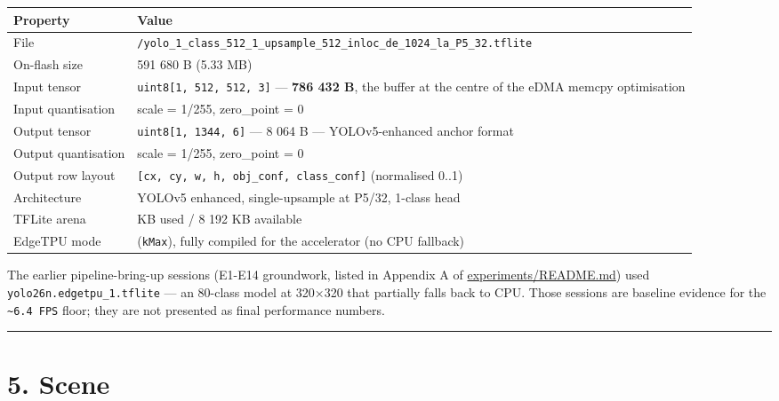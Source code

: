 {\def\LTcaptype{none} %
\begin{longtable}[]{@{}
  >{\raggedright\arraybackslash}p{}
  >{\raggedright\arraybackslash}p{}@{}}
\toprule\noalign{}
\begin{minipage}[b]{\linewidth}\raggedright
Property
\end{minipage} & \begin{minipage}[b]{\linewidth}\raggedright
Value
\end{minipage} \\
\midrule\noalign{}
\endhead
\bottomrule\noalign{}
\endlastfoot
File &
\texttt{/yolo\_1\_class\_512\_1\_upsample\_512\_inloc\_de\_1024\_la\_P5\_32.tflite} \\
On-flash size & 5 591 680 B (5.33 MB) \\
Input tensor & \texttt{uint8{[}1,\ 512,\ 512,\ 3{]}} --- \textbf{786 432
B}, the buffer at the centre of the eDMA memcpy optimisation \\
Input quantisation & scale = 1/255, zero\_point = 0 \\
Output tensor & \texttt{uint8{[}1,\ 1344,\ 6{]}} --- 8 064 B ---
YOLOv5-enhanced anchor format \\
Output quantisation & scale = 1/255, zero\_point = 0 \\
Output row layout &
\texttt{{[}cx,\ cy,\ w,\ h,\ obj\_conf,\ class\_conf{]}} (normalised
0..1) \\
Architecture & YOLOv5 enhanced, single-upsample at P5/32, 1-class
head \\
TFLite arena & 799 KB used / 8 192 KB available \\
EdgeTPU mode & 3 (\texttt{kMax}), fully compiled for the accelerator (no
CPU fallback) \\
\end{longtable}
}

The earlier pipeline-bring-up sessions (E1-E14 groundwork, listed in
Appendix A of \href{../experiments/README.md}{experiments/README.md})
used \texttt{yolo26n.edgetpu\_1.tflite} --- an 80-class model at 320×320
that partially falls back to CPU. Those sessions are baseline evidence
for the \texttt{\textasciitilde{}6.4\ FPS} floor; they are not presented
as final performance numbers.

\begin{center}\rule{0.5\linewidth}{0.5pt}\end{center}

\section{5. Scene}\label{scene}

